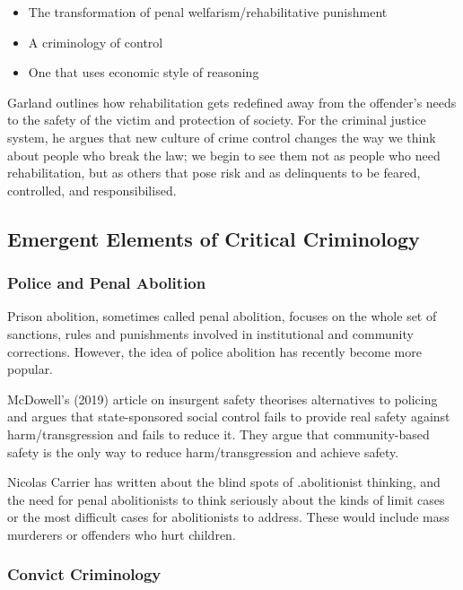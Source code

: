 \documentclass{article}
\begin{document}
\begin{itemize}
    \item The transformation of penal welfarism/rehabilitative punishment
    \item A criminology of control
    \item One that uses economic style of reasoning
\end{itemize}

Garland outlines how rehabilitation gets redefined away from the offender’s needs to the safety of the victim and protection of society. For the criminal justice system, he argues that new culture of crime control changes the way we think about people who break the law; we begin to see them not as people who need rehabilitation, but as others that pose risk and as delinquents to be feared, controlled, and responsibilised.

\subsection{Emergent Elements of Critical Criminology}

\subsubsection*{Police and Penal Abolition}

Prison abolition, sometimes called penal abolition, focuses on the whole set of sanctions, rules and punishments involved in institutional and community corrections. However, the idea of police abolition has recently become more popular. 

McDowell’s (2019) article on insurgent safety theorises alternatives to policing and argues that state-sponsored social control fails to provide real safety against harm/transgression and fails to reduce it. They argue that community-based safety is the only way to reduce harm/transgression and achieve safety.

Nicolas Carrier has written about the blind spots of .abolitionist thinking, and the need for penal abolitionists to think seriously about the kinds of limit cases or the most difficult cases for abolitionists to address. These would include mass murderers or offenders who hurt children.

\subsubsection*{Convict Criminology}
\end{document}
